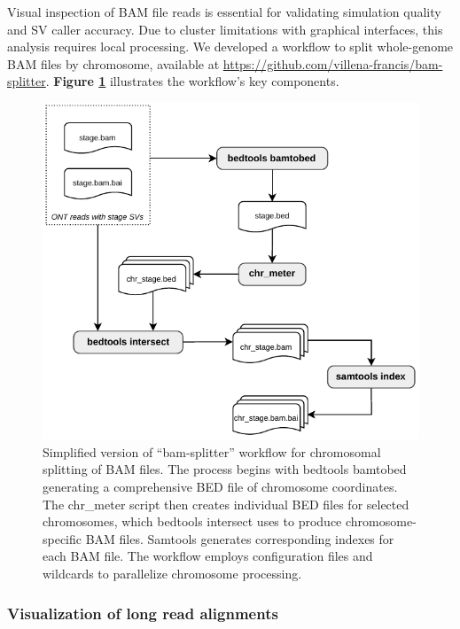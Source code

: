 Visual inspection of BAM file reads is essential for validating simulation 
quality and SV caller accuracy. Due to cluster limitations with graphical 
interfaces, this analysis requires local processing. We developed a workflow to 
split whole-genome BAM files by chromosome, available at 
\url{https://github.com/villena-francis/bam-splitter}. 
\textbf{Figure \ref{fig:bam-splitter}} illustrates the workflow's key 
components.

\begin{figure}[H]
    \centering
    \includegraphics[scale=1.3]{img/bam-splitter.pdf}
    \caption[Simplified version of ``bam-splitter'' workflow for chromosomal 
    splitting of BAM files]{Simplified version of ``bam-splitter'' workflow for 
    chromosomal splitting of BAM files. The process begins with bedtools 
    bamtobed generating a comprehensive BED file of chromosome coordinates. 
    The chr\_meter script then creates individual BED files for selected 
    chromosomes, which bedtools intersect uses to produce chromosome-specific 
    BAM files. Samtools generates corresponding indexes for each BAM file. The 
    workflow employs configuration files and wildcards to parallelize chromosome 
    processing.}
    \label{fig:bam-splitter}
\end{figure}

\subsubsection{Visualization of long read alignments}

